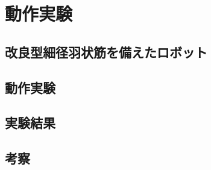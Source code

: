 \newpage
\section{動作実験}
\subsection{改良型細径羽状筋を備えたロボット}
\subsection{動作実験}
\subsection{実験結果}
\subsection{考察}
